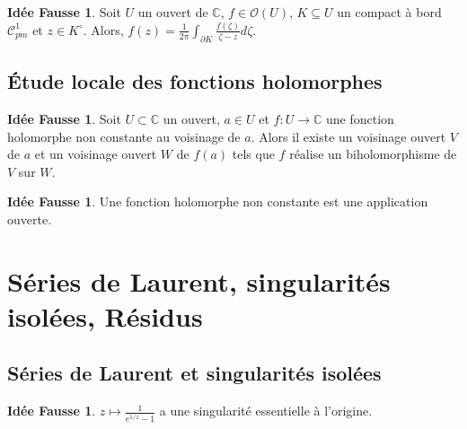 \documentclass[11pt,a4paper]{article}
\newcommand{\C}{\mathbb{C}}
\theoremstyle{definition}
\newtheorem{ideeFausse}[theoreme]{Idée Fausse}
\theoremstyle{plain}
\begin{document}
\begin{ideeFausse}
Soit $U$ un ouvert de $\C$, $f\in \mathcal O(U)$, $K\subseteq U$ un compact à bord $\mathcal C^1_{pm}$ et $z\in K^\circ$.
Alors, $f(z) =\frac{1}{2\pi} \int_{\partial K}\frac{f(\zeta)}{\zeta-z}d\zeta $.
\end{ideeFausse}

\subsection{Étude locale des fonctions holomorphes}


\begin{ideeFausse}
Soit $U\subset \C$ un ouvert, $a\in U$ et $f : U\to \C$ une fonction holomorphe non constante au voisinage de $a$.
Alors il existe un voisinage ouvert $V$ de $a$ et un voisinage ouvert $W$ de $f(a)$ tels que $f$ réalise un biholomorphisme de $V$ sur $W$.
\end{ideeFausse}

\begin{ideeFausse}
Une fonction holomorphe non constante est une application ouverte.
\end{ideeFausse}

%






\section{Séries de Laurent, singularités isolées, Résidus}




\subsection{Séries de Laurent et singularités isolées}






\begin{ideeFausse}
$z\mapsto \frac{1}{e^{1/z}-1}$ a une singularité essentielle à l'origine.
\end{ideeFausse}
\end{document}
